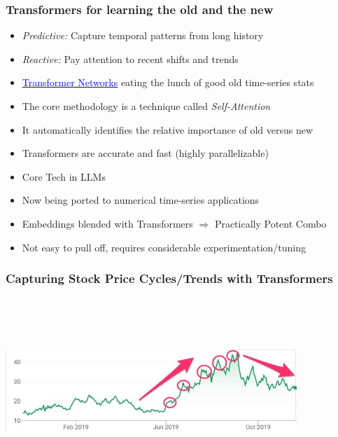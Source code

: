 \documentclass[handout]{beamer}
\begin{document}
\begin{frame}
\frametitle{Transformers for learning the old and the new}
\pause
\begin{itemize}[<+->]
\item {\em Predictive:} Capture temporal patterns from long history
\item {\em Reactive:} Pay attention to recent shifts and trends
\item \href{https://en.wikipedia.org/wiki/Transformer_(machine_learning_model)}{\underline{\textcolor{blue}{Transformer Networks}}} eating the lunch of good old time-series stats
\item The core methodology is a technique called {\em Self-Attention}
\item It automatically identifies the relative importance of old versus new
\item Transformers are accurate and fast (highly parallelizable)
\item Core Tech in LLMs
\item Now being ported to numerical time-series applications
\item Embeddings blended with Transformers $\Rightarrow$ Practically Potent Combo
\item Not easy to pull off, requires considerable experimentation/tuning
\end{itemize}
\end{frame}

\begin{frame}
\frametitle{Capturing Stock Price Cycles/Trends with Transformers}
\includegraphics[width=11cm, height=7cm]{../supply_chain/StockPriceTransformer.jpg}
\end{frame}
\end{document}
